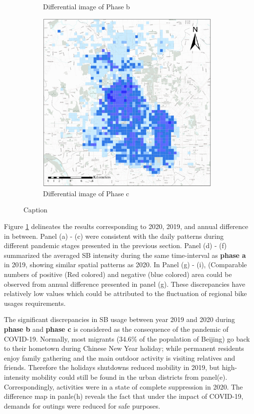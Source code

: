 \documentclass[preprints,ijgi,submit,moreauthors]{Definitions/mdpi}
\begin{document}
\begin{figure}[ht]
\begin{subfigure}{.3\textwidth}
        \caption{Differential image of Phase b}
    \end{subfigure}
        \begin{subfigure}{.3\textwidth}
        \includegraphics[width=\textwidth]{Figures/BSSMinusmp3.eps}
        \caption{Differential image of Phase c}
    \end{subfigure}
    \caption{Caption}
    \label{fig:compare_2019_and_2020}
\end{figure}

Figure \ref{fig:compare_2019_and_2020} delineates the results corresponding to 2020, 2019, and annual difference in between.
Panel (a) - (c) were consistent with the daily patterns during different pandemic stages presented in the previous section.
Panel (d) - (f) summarized the averaged SB intensity during the same time-interval as \textbf{phase a} in 2019, showing similar spatial patterns as 2020. 
In Panel (g) - (i), (Comparable numbers of positive (Red colored) and negative (blue colored) area could be observed from annual difference presented in panel (g). These discrepancies have relatively low values which could be attributed to the fluctuation of regional bike usages requirements.  

The significant discrepancies in SB usage between year 2019 and 2020 during \textbf{phase b} and \textbf{phase c} is considered as the consequence of the pandemic of COVID-19. 
Normally, most migrants ($34.6\%$ of the population of Beijing) go back to their hometown during Chinese New Year holiday; while permanent residents enjoy family gathering and the main outdoor activity is visiting relatives and friends.
Therefore the holidays shutdowns reduced mobility in 2019, but high-intensity mobility could still be found in the urban districts from panel(e). 
Correspondingly, activities were in a state of complete suppression in 2020. 
The difference map in panle(h) reveals the fact that under the impact of COVID-19, demands for outings were reduced for safe purposes.
\end{document}
